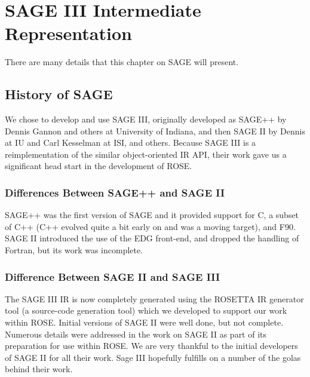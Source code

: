 \chapter{SAGE III Intermediate Representation}
\label{SageIII}

There are many details that this chapter on SAGE will present.



\section{History of SAGE}
    We chose to develop and use SAGE III, originally 
developed as SAGE++ by Dennis Gannon and others at University 
of Indiana, and then SAGE II by Dennis at IU and Carl Kesselman at ISI,
and others.  Because SAGE III is a reimplementation of the similar
object-oriented IR API, their work gave us a significant head 
start in the development of ROSE.

\subsection{Differences Between SAGE++ and SAGE II}
     SAGE++ was the first version of SAGE and it provided
support for C, a subset of C++ (C++ evolved quite a bit early on
and was a moving target), and F90. SAGE II introduced the use
of the EDG front-end, and dropped the handling of Fortran, 
but its work was incomplete.

\subsection{Difference Between SAGE II and SAGE III}
   The SAGE III IR is now completely generated using the ROSETTA
IR generator tool (a source-code generation tool) which we
developed to support our work within ROSE.  Initial versions 
of SAGE II were well done, but not complete.  Numerous 
details were addressed in the work on SAGE II as part of its 
preparation for use within ROSE.  We are very thankful to the 
initial developers of SAGE II for all their work.  Sage III
hopefully fulfills on a number of the golas behind their work.


